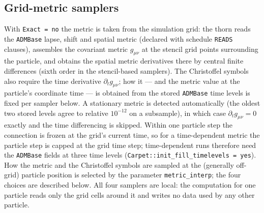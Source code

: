 \documentclass[11pt]{article}
\begin{document}
\subsection{Grid-metric samplers}\label{sec:samplers}

With \texttt{Exact = no} the metric is taken from the simulation grid: the
thorn reads the \texttt{ADMBase} lapse, shift and spatial metric (declared
with schedule \texttt{READS} clauses), assembles the covariant metric
$g_{\mu\nu}$ at the stencil grid points surrounding the particle, and
obtains the spatial metric derivatives there by central finite
differences (sixth order in the stencil-based samplers).  The
Christoffel symbols also require the time derivative
$\partial_t g_{\mu\nu}$; how it --- and the metric value at the particle's
coordinate time --- is obtained from the stored \texttt{ADMBase} time
levels is fixed per sampler below.  A stationary metric is detected
automatically (the oldest two stored levels agree to relative $10^{-12}$
on a subsample), in which case $\partial_t g_{\mu\nu} = 0$ exactly and the
time differencing is skipped.  Within one particle step the connection is
frozen at the grid's current time, so for a time-dependent metric the
particle step is capped at the grid time step; time-dependent runs
therefore need the \texttt{ADMBase} fields at three time levels
(\texttt{Carpet::init\_fill\_timelevels = yes}).  How the metric and the
Christoffel symbols are sampled at the (generally off-grid) particle
position is selected by the parameter \texttt{metric\_interp}; the four
choices are described below.  All four samplers are local: the
computation for one particle reads only the grid cells around it and
writes no data used by any other particle.
\end{document}
